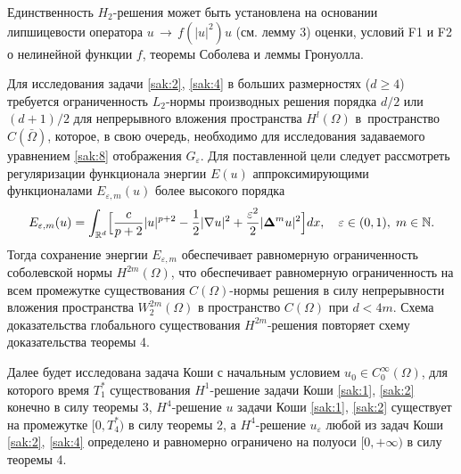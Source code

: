 Единственность $H_{2}$-решения может быть установлена на
основании липшицевости оператора $u\, \to \, f(|u|^2)u$ (см. лемму 3) оценки,  условий {\sc F1} и {\sc F2} о нелинейной функции $f$, теоремы Соболева и леммы Гронуолла.


\smallskip

 Для
исследования задачи \eqref{sak:2}, \eqref{sak:4} в больших размерностях
($d\geq 4$) требуется ограниченность $L_{2}$-нормы производных
решения порядка ${d/ 2 }$ или ${({d+1})/2 }$ для непрерывного вложения пространства $H^{l}(\Omega )$ в~пространство $C(\bar \Omega )$, которое, в свою очередь, необходимо для исследования задаваемого уравнением \eqref{sak:8}
отображения $G_{\varepsilon}$. 
Для поставленной цели следует рассмотреть регуляризации функционала энергии $E(u)$ аппроксимирующими
функционалами $E_{\varepsilon,m}(u)$ более высокого порядка
$$
E_{\varepsilon,m}(u)
=\int_{\mathbb R^{d}}\Bigl[{c\over {p+2}}|u|^{p+2}-{1\over 2 }|\nabla
u|^{2}+{{\varepsilon^{2}}\over 2}|{\bf \Delta }^{m}u|^{2}\Bigr]dx,\quad  \varepsilon\in
(0, 1),\; m\in {\mathbb  N}.
$$
Тогда сохранение энергии $E_{\varepsilon,m}$ обеспечивает равномерную
ограниченность соболевской нормы $H^{2m}(\Omega )$, что
обеспечивает равномерную ограниченность на всем промежутке
существования $C(\Omega )$-нормы решения в силу непрерывности
вложения пространства $W^{2m}_{2}(\Omega )$ в пространство
$C(\Omega )$ при $d<4m$. Схема доказательства глобального
существования $H^{2m}$-решения повторяет схему доказательства
теоремы 4.

\pagebreak

Далее будет исследована задача Коши с  начальным условием  $u_0\in C_0^{\infty }(\Omega )$, для которого время $T^*_1$ существования $H^1$-решение задачи Коши \eqref{sak:1}, \eqref{sak:2} конечно в силу теоремы 3,  $H^4$-решение $u$ задачи Коши \eqref{sak:1}, \eqref{sak:2} существует на промежутке $[0,T_4^*)$ в силу теоремы 2, а $H^4$-решение $u_{\varepsilon}$
любой из задач Коши \eqref{sak:2}, \eqref{sak:4} определено и равномерно ограничено на полуоси $[0,+\infty )$ в силу теоремы 4.

\smallskip

